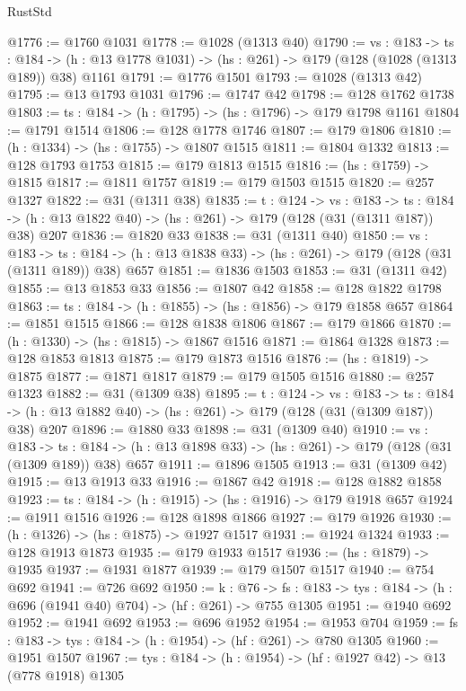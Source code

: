 \begin{lexlean}{RustStd}
\begin{coremodule}
{\begin{coremodule}
{{{{{@1776 := @1760 @1031
@1778 := @1028 (@1313 @40)
@1790 := {vs : @183} ->
  {ts : @184} -> (h : @13 @1778 @1031) -> (hs : @261) -> @179 (@128 (@1028 (@1313 @189)) @38) @1161
@1791 := @1776 @1501
@1793 := @1028 (@1313 @42)
@1795 := @13 @1793 @1031
@1796 := @1747 @42
@1798 := @128 @1762 @1738
@1803 := {ts : @184} -> (h : @1795) -> (hs : @1796) -> @179 @1798 @1161
@1804 := @1791 @1514
@1806 := @128 @1778 @1746
@1807 := @179 @1806
@1810 := (h : @1334) -> (hs : @1755) -> @1807 @1515
@1811 := @1804 @1332
@1813 := @128 @1793 @1753
@1815 := @179 @1813 @1515
@1816 := (hs : @1759) -> @1815
@1817 := @1811 @1757
@1819 := @179 @1503 @1515
@1820 := @257 @1327
@1822 := @31 (@1311 @38)
@1835 := {t : @124} ->
  {vs : @183} ->
  {ts : @184} -> (h : @13 @1822 @40) -> (hs : @261) -> @179 (@128 (@31 (@1311 @187)) @38) @207
@1836 := @1820 @33
@1838 := @31 (@1311 @40)
@1850 := {vs : @183} ->
  {ts : @184} -> (h : @13 @1838 @33) -> (hs : @261) -> @179 (@128 (@31 (@1311 @189)) @38) @657
@1851 := @1836 @1503
@1853 := @31 (@1311 @42)
@1855 := @13 @1853 @33
@1856 := @1807 @42
@1858 := @128 @1822 @1798
@1863 := {ts : @184} -> (h : @1855) -> (hs : @1856) -> @179 @1858 @657
@1864 := @1851 @1515
@1866 := @128 @1838 @1806
@1867 := @179 @1866
@1870 := (h : @1330) -> (hs : @1815) -> @1867 @1516
@1871 := @1864 @1328
@1873 := @128 @1853 @1813
@1875 := @179 @1873 @1516
@1876 := (hs : @1819) -> @1875
@1877 := @1871 @1817
@1879 := @179 @1505 @1516
@1880 := @257 @1323
@1882 := @31 (@1309 @38)
@1895 := {t : @124} ->
  {vs : @183} ->
  {ts : @184} -> (h : @13 @1882 @40) -> (hs : @261) -> @179 (@128 (@31 (@1309 @187)) @38) @207
@1896 := @1880 @33
@1898 := @31 (@1309 @40)
@1910 := {vs : @183} ->
  {ts : @184} -> (h : @13 @1898 @33) -> (hs : @261) -> @179 (@128 (@31 (@1309 @189)) @38) @657
@1911 := @1896 @1505
@1913 := @31 (@1309 @42)
@1915 := @13 @1913 @33
@1916 := @1867 @42
@1918 := @128 @1882 @1858
@1923 := {ts : @184} -> (h : @1915) -> (hs : @1916) -> @179 @1918 @657
@1924 := @1911 @1516
@1926 := @128 @1898 @1866
@1927 := @179 @1926
@1930 := (h : @1326) -> (hs : @1875) -> @1927 @1517
@1931 := @1924 @1324
@1933 := @128 @1913 @1873
@1935 := @179 @1933 @1517
@1936 := (hs : @1879) -> @1935
@1937 := @1931 @1877
@1939 := @179 @1507 @1517
@1940 := @754 @692
@1941 := @726 @692
@1950 := {k : @76} ->
  {fs : @183} -> {tys : @184} -> (h : @696 (@1941 @40) @704) -> (hf : @261) -> @755 @1305
@1951 := @1940 @692
@1952 := @1941 @692
@1953 := @696 @1952
@1954 := @1953 @704
@1959 := {fs : @183} -> {tys : @184} -> (h : @1954) -> (hf : @261) -> @780 @1305
@1960 := @1951 @1507
@1967 := {tys : @184} -> (h : @1954) -> (hf : @1927 @42) -> @13 (@778 @1918) @1305
}}}}}
\end{coremodule}}
\end{coremodule}
\end{lexlean}
